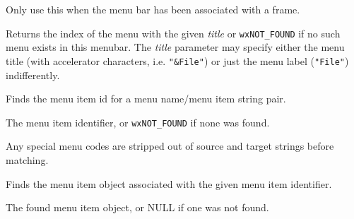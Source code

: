 
Only use this when the menu bar has been
associated with a frame.


\label{wxmenubarfindmenu}


Returns the index of the menu with the given {\it title} or {\tt wxNOT\_FOUND} if no
such menu exists in this menubar. The {\it title} parameter may specify either
the menu title (with accelerator characters, i.e. {\tt "\&File"}) or just the
menu label ({\tt "File"}) indifferently.


\label{wxmenubarfindmenuitem}


Finds the menu item id for a menu name/menu item string pair.





The menu item identifier, or {\tt wxNOT\_FOUND} if none was found.


Any special menu codes are stripped out of source and target strings
before matching.


\label{wxmenubarfinditem}


Finds the menu item object associated with the given menu item identifier.





The found menu item object, or NULL if one was not found.


\label{wxmenubargethelpstring}


